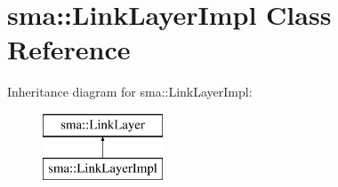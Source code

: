 \hypertarget{classsma_1_1LinkLayerImpl}{\section{sma\-:\-:Link\-Layer\-Impl Class Reference}
\label{classsma_1_1LinkLayerImpl}
}
Inheritance diagram for sma\-:\-:Link\-Layer\-Impl\-:\begin{figure}[H]
\begin{center}
\leavevmode
\includegraphics[height=2.000000cm]{classsma_1_1LinkLayerImpl}
\end{center}
\end{figure}

